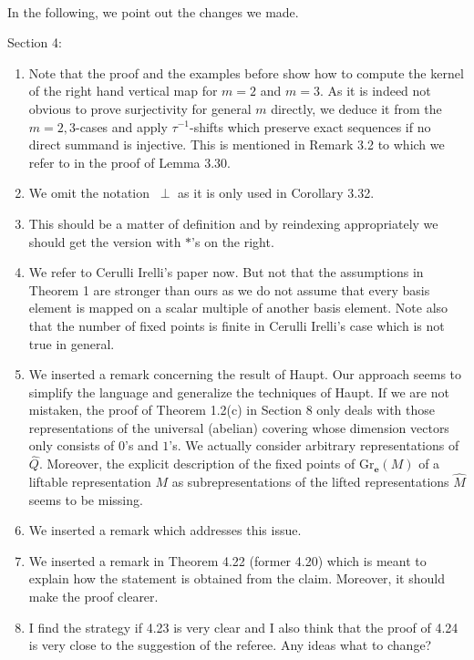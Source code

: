 \documentclass[titlepage,11pt,a4paper]{{scrartcl}}
\begin{document}
\pagestyle{empty}


\\



\noindent In the following, we point out the changes we made.

Section 4:
\begin{enumerate}
\renewcommand{\labelenumi}{(\arabic{enumi})}
\item Note that the proof and the examples before show how to compute the kernel of the right hand vertical map for $m=2$ and $m=3$. As it is indeed not obvious to prove surjectivity for general $m$ directly, we deduce it from the $m=2,3$-cases and apply $\tau^{-1}$-shifts which preserve exact sequences if no direct summand is injective. This is mentioned in Remark 3.2 to which we refer to in the proof of Lemma 3.30.
\item We omit the notation $~\perp$ as it is only used in Corollary 3.32.
\item This should be a matter of definition and by reindexing appropriately we should get the version with $\ast$'s on the right.
\item We refer to Cerulli Irelli's paper now. But not that the assumptions in Theorem 1 are stronger than ours as we do not assume that every basis element is mapped on a scalar multiple of another basis element. Note also that the number of fixed points is finite in Cerulli Irelli's case which is not true in general.
\item We inserted a remark concerning the result of Haupt. Our approach seems to simplify the language and generalize the techniques of Haupt. If we are not mistaken, the proof of Theorem 1.2(c) in Section 8 only deals with those representations of the universal (abelian) covering whose dimension vectors only consists of $0$'s and $1$'s. We actually consider arbitrary representations of $\hat Q$. Moreover, the explicit description of the fixed points of $\mathrm{Gr}_{\mathbf{e}}(M)$ of a liftable representation $M$ as subrepresentations of the lifted representations $\hat M$ seems to be missing.  

\item We inserted a remark which addresses this issue.
\item We inserted a remark in Theorem 4.22 (former 4.20) which is meant to explain how the statement is obtained from the claim. Moreover, it should make the proof clearer.
\item I find the strategy if 4.23 is very clear and I also think that the proof of 4.24 is very close to the suggestion of the referee. Any ideas what to change?
\end{enumerate}
\end{document}
